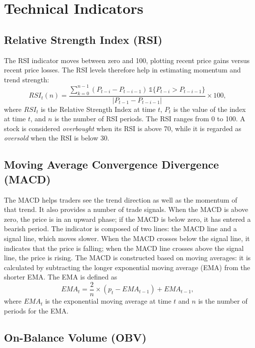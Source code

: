 \section{Technical Indicators}

\subsection{Relative Strength Index (RSI)}

The RSI indicator moves between zero and 100, plotting recent price gains versus recent
price losses. The RSI levels therefore help in estimating momentum and trend strength:
\begin{equation}
  RSI_t(n) = \frac{\sum_{k=0}^{n-1}(P_{t-i}-P_{t-i-1})\,\mathbb{1}\{P_{t-i}>P_{t-i-1}\}}{\lvert P_{t-1}-P_{t-i-1}\rvert}\times 100,
\end{equation}
where $RSI_t$ is the Relative Strength Index at time $t$, $P_t$ is the value of the index
at time $t$, and $n$ is the number of RSI periods. The RSI ranges from 0 to 100. A stock
is considered \emph{overbought} when its RSI is above 70, while it is regarded as
\emph{oversold} when the RSI is below 30.

\subsection{Moving Average Convergence Divergence (MACD)}

The MACD helps traders see the trend direction as well as the momentum of that trend. It
also provides a number of trade signals. When the MACD is above zero, the price is in an
upward phase; if the MACD is below zero, it has entered a bearish period. The indicator is
composed of two lines: the MACD line and a signal line, which moves slower. When the MACD
crosses below the signal line, it indicates that the price is falling; when the MACD line
crosses above the signal line, the price is rising. The MACD is constructed based on
moving averages: it is calculated by subtracting the longer exponential moving average
(EMA) from the shorter EMA. The EMA is defined as
\begin{equation}
  EMA_t = \frac{2}{n}\times(p_t - EMA_{t-1}) + EMA_{t-1},
\end{equation}
where $EMA_t$ is the exponential moving average at time $t$ and $n$ is the number of
periods for the EMA.

\subsection{On-Balance Volume (OBV)}

